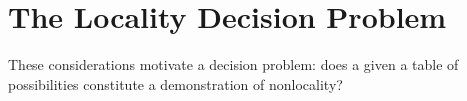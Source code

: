 \documentclass[reprint]{revtex4-1}
\theoremstyle{definition}
\begin{document}



\section{The Locality Decision Problem}


These considerations motivate a decision problem: does a given a table of possibilities constitute a demonstration of nonlocality?
\end{document}

